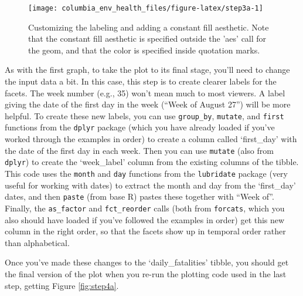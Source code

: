 \documentclass[]{tufte-book}
\begin{document}
\begin{figure}
\texttt{[image: columbia\_env\_health\_files/figure-latex/step3a-1]} \caption[Customizing the labeling and adding a constant fill aesthetic]{Customizing the labeling and adding a constant fill aesthetic. Note that the constant fill aesthetic is specified outside the 'aes' call for the geom, and that the color is specified inside quotation marks.}\label{fig:step3a}
\end{figure}

As with the first graph, to take the plot to its final stage, you'll need to
change the input data a bit. In this case, this step is to create clearer labels for
the facets. The week number (e.g., 35) won't mean much to most viewers. A label giving
the date of the first day in the week (``Week of August 27'') will be more helpful.
To create these new labels, you can use \texttt{group\_by}, \texttt{mutate}, and \texttt{first} functions
from the \texttt{dplyr} package (which you have already loaded if you've worked through
the examples in order) to create a column called `first\_day' with the date of the
first day in each week. Then you can use \texttt{mutate} (also from \texttt{dplyr}) to create the
`week\_label' column from the existing columns of the tibble. This code uses the
\texttt{month} and \texttt{day} functions from the \texttt{lubridate} package (very useful for
working with dates) \citep{R-lubridate} to extract the month and day from the `first\_day'
dates, and then \texttt{paste} (from base R) pastes these together with ``Week of''.
Finally, the \texttt{as\_factor} and \texttt{fct\_reorder} calls (both from \texttt{forcats}, which you
also should have loaded if you've followed the examples in order) get this new
column in the right order, so that the facets show up in temporal order rather
than alphabetical.

Once you've made these changes to the `daily\_fatalities' tibble, you should get the
final version of the plot when you re-run the plotting code used in the last step,
getting Figure \ref{fig:step4a}.
\end{document}

